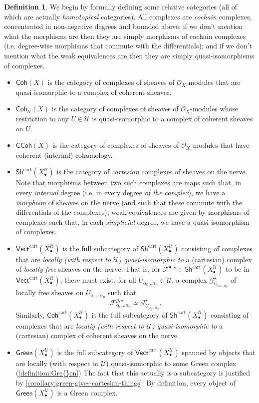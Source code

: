 \documentclass[11pt,fleqn]{article}
\theoremstyle{plain}
\theoremstyle{definition}
\newtheorem{definition}[theorem]{Definition}
\theoremstyle{remark}
\numberwithin{equation}{theorem}
\newcommand{\cover}{\mathcal{U}}
\newcommand{\OO}{\mathcal{O}}
\newcommand{\anotherbullet}{\star}
\newcommand{\gcohX}{\mathsf{Coh}(X)}
\newcommand{\gcohUX}{\mathsf{Coh}_{\cover}(X)}
\newcommand{\gccohX}{\mathsf{CCoh}(X)}
\newcommand{\cartvectX}{\mathsf{Vect}^\mathrm{cart}(X_\bullet^\cover)}
\newcommand{\cartcohX}{\mathsf{Coh}^\mathrm{cart}(X_\bullet^\cover)}
\newcommand{\cartshX}{\mathsf{Sh}^\mathrm{cart}(X_\bullet^\cover)}
\newcommand{\greenX}{\mathsf{Green}(X_\bullet^\cover)}
\begin{document}
        \begin{definition}
            We begin by formally defining some relative categories (all of which are actually \emph{homotopical} categories).
            All complexes are \emph{cochain} complexes, concentrated in non-negative degrees and bounded above; if we don't mention what the morphisms are then they are simply morphisms of cochain complexes (i.e. degree-wise morphisms that commute with the differentials); and if we don't mention what the weak equivalences are then they are simply quasi-isomorphisms of complexes.
            \begin{itemize}
                \item $\gcohX$ is the category of complexes of sheaves of $\OO_X$-modules that are quasi-isomorphic to a complex of coherent sheaves.
                \item $\gcohUX$ is the category of complexes of sheaves of $\OO_X$-modules whose restriction to any $U\in\cover$ is quasi-isomorphic to a complex of coherent sheaves on $U$.
                \item $\gccohX$ is the category of complexes of sheaves of $\OO_X$-modules that have coherent (internal) cohomology.
                \item $\cartshX$ is the category of \emph{cartesian} complexes of sheaves on the nerve.
                    Note that morphisms between two such complexes are maps such that, in every \emph{internal} degree (i.e. in every degree \emph{of the complex}), we have a \emph{morphism} of sheaves on the nerve (and such that these commute with the differentials of the complexes); weak equivalences are given by morphisms of complexes such that, in each \emph{simplicial} degree, we have a quasi-isomorphism of complexes.
                \item $\cartvectX$ is the full subcategory of $\cartshX$ consisting of complexes that are \emph{locally (with respect to $\cover$) quasi-isomorphic to} a (cartesian) complex of \emph{locally free} sheaves on the nerve.
                    That is, for $\mathcal{F}^{\bullet,\anotherbullet}\in\cartshX$ to be in $\cartvectX$, there must exist, for all $U_{\alpha_0\ldots\alpha_p}\in\cover$, a complex $\mathcal{G}_{U_{\alpha_0\ldots\alpha_p}}^{\anotherbullet}$ of {locally free} sheaves on $U_{\alpha_0\ldots\alpha_p}$ such that \[\mathcal{F}^{p,\anotherbullet}_{\alpha_0\ldots\alpha_p} \simeq \mathcal{G}_{U_{\alpha_0\ldots\alpha_p}}^\anotherbullet.\]
                    Similarly, $\cartcohX$ is the full subcategory of $\cartshX$ consisting of complexes that are \emph{locally (with respect to $\cover$) quasi-isomorphic to} a (cartesian) complex of coherent sheaves on the nerve.
                \item $\greenX$ is the full subcategory of $\cartvectX$ spanned by objects that are locally (with respect to $\cover$) quasi-isomorphic to some Green complex (\cref{definition:Gre{}en})
                    The fact that this actually is a subcategory is justified by \cref{corollary:green-gives-cartesian-things}.
                    By definition, every object of $\greenX$ is a Gre{}en complex.
            \end{itemize}


\end{definition}
\end{document}
